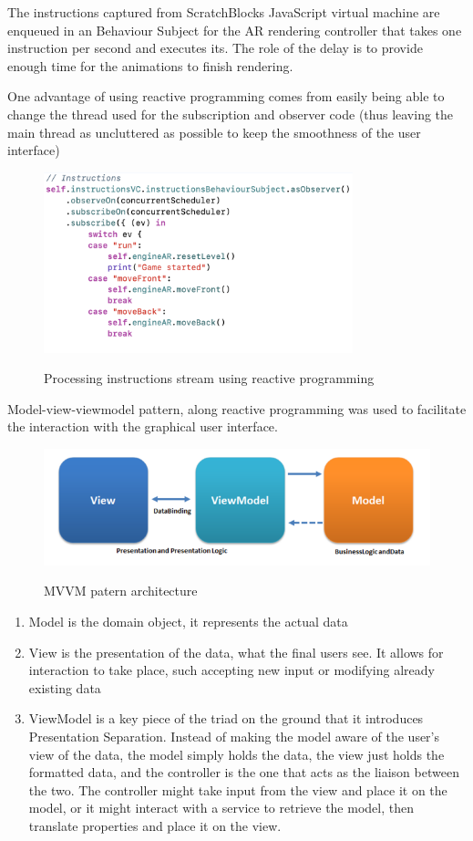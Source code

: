 \documentclass[12 pct]{report}
\begin{document}
The instructions captured from ScratchBlocks JavaScript virtual machine are enqueued in an Behaviour Subject for the AR rendering controller that takes one instruction per second and executes its. The role of the delay is to provide enough time for the animations to finish rendering. 

One advantage of using reactive programming comes from easily being able to change the thread used for the subscription and observer code (thus leaving the main thread as uncluttered as possible to keep the smoothness of the user interface)
\begin{figure}[H]
\includegraphics[width=0.8\textwidth]{reactive-instructions}
\centering
\label{fig:reactive-repository}
\caption{Processing instructions stream using reactive programming}
\end{figure}

Model-view-viewmodel pattern, along reactive programming was used to facilitate the interaction with the graphical user interface.

\begin{figure}[H]
\includegraphics[width=1.0\textwidth]{mvvm}
\centering
\label{fig:reactive-repository}
\caption{MVVM patern architecture }
\end{figure}

\begin{enumerate}
\item Model is the domain object, it represents the actual data 
\item View is the presentation of the data, what the final users see. It allows for interaction to take place, such accepting new input or  modifying already existing data
\item ViewModel is a key piece of the triad on the ground that it introduces Presentation Separation.  Instead of making the model aware of the user’s view of the data, the model simply holds the data, the view just holds the formatted data, and the controller is the one that acts as the liaison between the two. The controller might take input from the view and place it on the model, or it might interact with a service to retrieve the model, then translate properties and place it on the view.
\end{enumerate}
\end{document}

